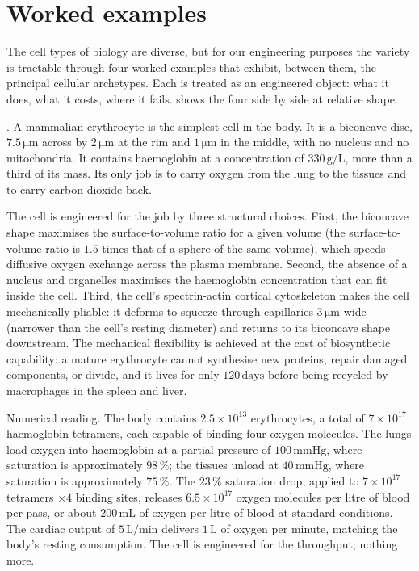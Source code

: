 \section{Worked examples}

The cell types of biology are diverse, but for our engineering
purposes the variety is tractable through four worked examples that
exhibit, between them, the principal cellular archetypes. Each is
treated as an engineered object: what it does, what it costs, where
it fails.  shows the four
side by side at relative shape.



. A mammalian
erythrocyte is the simplest cell in the body. It is a biconcave disc,
$7.5\,\si{\micro\meter}$ across by $2\,\si{\micro\meter}$ at the rim
and $1\,\si{\micro\meter}$ in the middle, with no nucleus and no
mitochondria. It contains haemoglobin at a concentration of
$330\,\text{g}/\text{L}$, more than a third of its mass. Its only job
is to carry oxygen from the lung to the tissues and to carry carbon
dioxide back.

The cell is engineered for the job by three structural choices. First,
the biconcave shape maximises the surface-to-volume ratio for a given
volume (the surface-to-volume ratio is $1.5$ times that of a sphere of
the same volume), which speeds diffusive oxygen exchange across the
plasma membrane. Second, the absence of a nucleus and organelles
maximises the haemoglobin concentration that can fit inside the cell.
Third, the cell's spectrin-actin cortical cytoskeleton makes the cell
mechanically pliable: it deforms to squeeze through capillaries
$3\,\si{\micro\meter}$ wide (narrower than the cell's resting
diameter) and returns to its biconcave shape downstream. The
mechanical flexibility is achieved at the cost of biosynthetic
capability: a mature erythrocyte cannot synthesise new proteins, repair
damaged components, or divide, and it lives for only $120\,\text{days}$
before being recycled by macrophages in the spleen and liver.

Numerical reading. The body contains $2.5 \times 10^{13}$
erythrocytes, a total of $7 \times 10^{17}$ haemoglobin tetramers,
each capable of binding four oxygen molecules. The lungs load
oxygen into haemoglobin at a partial pressure of $100\,\text{mmHg}$,
where saturation is approximately $98\,\%$; the tissues unload at
$40\,\text{mmHg}$, where saturation is approximately $75\,\%$. The
$23\,\%$ saturation drop, applied to $7 \times 10^{17}$ tetramers
$\times 4$ binding sites, releases $6.5 \times 10^{17}$ oxygen
molecules per litre of blood per pass, or about $200\,\text{mL}$ of
oxygen per litre of blood at standard conditions. The cardiac
output of $5\,\text{L}/\text{min}$ delivers $1\,\text{L}$ of oxygen
per minute, matching the body's resting consumption. The cell is
engineered for the throughput; nothing more.

